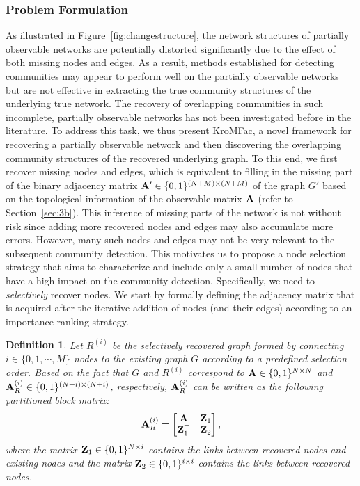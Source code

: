 \documentclass[format=acmsmall, review=false, screen=true]{acmart}
\newtheorem{definition}{Definition}%
\begin{document}
\subsubsection{Problem Formulation} As illustrated in Figure~\ref{fig:changestructure}, the network structures of partially observable networks are potentially distorted significantly due to the effect of both missing nodes and edges. As a result, methods established for detecting communities may appear to perform well on the partially observable networks but are not effective in extracting the true community structures of the underlying true network. 
The recovery of overlapping communities in such incomplete, partially observable networks has not been investigated before in the literature. To address this task, we thus present \textsf{KroMFac}, a novel framework for recovering a partially observable network and then discovering the overlapping community structures of the recovered underlying graph. To this end, we first recover missing nodes and edges, which is equivalent to filling in the missing part of the binary adjacency matrix ${\bf A}' \in \{0,1\}^{(N+M) \times (N+M)}$ of the graph $G'$ based on the topological information of the observable matrix ${\bf A}$ (refer to Section~\ref{sec:3b}). This inference of missing parts of the network is not without risk since adding more recovered nodes and edges may also accumulate more errors. However, many such nodes and edges may not be very relevant to the subsequent community detection. This motivates us to propose a node selection strategy that aims to characterize and include only a small number of nodes that have a high impact on the community detection. Specifically, we need to {\em selectively} recover nodes. We start by formally defining the adjacency matrix that is acquired after the iterative addition of nodes (and their edges) according to an importance ranking strategy.

\begin{definition}\label{def:1}
Let $R^{(i)}$ be the selectively recovered graph formed by connecting $i \in\{0,1,\cdots,M\}$ nodes to the existing graph $G$ according to a predefined selection order. Based on the fact that $G$ and $R^{(i)}$ correspond to ${\bf A} \in \{0,1\}^{N \times N}$ and ${\bf A}_R^{(i)}  \in \{0,1\}^{(N + i )\times (N + i)}$, respectively, ${\bf A}_R^{(i)}$ can be written as the following partitioned block matrix:
\[
{\bf A}_R^{(i)}=
  \begin{bmatrix}
    {\bf A} & {\bf Z}_1 \\
    {\bf Z}_1^\top & {\bf Z}_2
  \end{bmatrix},
\]
where the matrix ${\bf Z}_1 \in \{0,1\}^{N \times i}$ contains the links between recovered nodes and existing nodes and the matrix ${\bf Z}_2 \in \{0,1\}^{i \times i}$ contains the links between recovered nodes. 
\end{definition}
\end{document}
